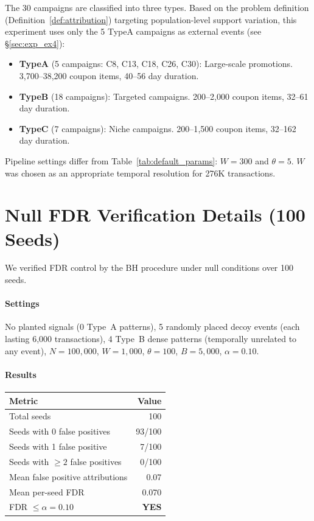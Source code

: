 The 30 campaigns are classified into three types.
Based on the problem definition (Definition~\ref{def:attribution})
targeting population-level support variation,
this experiment uses only the 5 TypeA campaigns as external events
(see \S\ref{sec:exp_ex4}):
\begin{itemize}
\item \textbf{TypeA} (5 campaigns: C8, C13, C18, C26, C30): Large-scale promotions.
    3{,}700--38{,}200 coupon items, 40--56 day duration.
\item \textbf{TypeB} (18 campaigns): Targeted campaigns.
    200--2{,}000 coupon items, 32--61 day duration.
\item \textbf{TypeC} (7 campaigns): Niche campaigns.
    200--1{,}500 coupon items, 32--162 day duration.
\end{itemize}

Pipeline settings differ from Table~\ref{tab:default_params}:
$W = 300$ and $\theta = 5$.
$W$ was chosen as an appropriate temporal resolution
for 276K transactions.

\section{Null FDR Verification Details (100 Seeds)}\label{app:null_fdr}

We verified FDR control by the BH procedure under null conditions over 100 seeds.

\paragraph{Settings}
No planted signals (0 Type~A patterns),
5 randomly placed decoy events (each lasting 6,000 transactions),
4 Type~B dense patterns (temporally unrelated to any event),
$N = 100{,}000$, $W = 1{,}000$, $\theta = 100$, $B = 5{,}000$, $\alpha = 0.10$.

\paragraph{Results}

\begin{center}
\begin{tabular}{lr}
\toprule
Metric & Value \\
\midrule
Total seeds & 100 \\
Seeds with 0 false positives & 93/100 \\
Seeds with 1 false positive & 7/100 \\
Seeds with $\geq 2$ false positives & 0/100 \\
Mean false positive attributions & 0.07 \\
Mean per-seed FDR & 0.070 \\
FDR $\leq \alpha = 0.10$ & \textbf{YES} \\
\bottomrule
\end{tabular}
\end{center}


